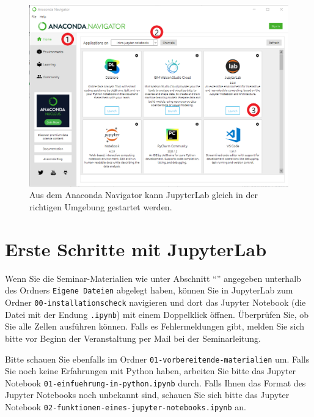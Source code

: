 \documentclass{tufte-handout}
\begin{document}
\begin{figure}[h]
  \includegraphics{anaconda-navigator-jupyterlab--mit-reihenfolge}
  \caption{Aus dem Anaconda Navigator kann JupyterLab gleich in der richtigen Umgebung gestartet werden.}%
\label{fig:start-jupyterlab}
\end{figure}

\section{Erste Schritte mit JupyterLab}

Wenn Sie die Seminar-Materialien wie unter Abschnitt \enquote{} angegeben unterhalb des Ordners \texttt{Eigene Dateien} abgelegt haben, 
können Sie in JupyterLab zum Ordner 
\texttt{00-installationscheck}
navigieren und dort das Jupyter Notebook (die Datei mit der Endung \texttt{.ipynb}) mit einem Doppelklick öffnen.
Überprüfen Sie, ob Sie alle Zellen ausführen können.
Falls es Fehlermeldungen gibt, melden Sie sich bitte vor Beginn der Veranstaltung per Mail bei der Seminarleitung.

Bitte schauen Sie ebenfalls im Ordner
\texttt{01-vorbereitende-materialien}
um.
Falls Sie noch keine Erfahrungen mit Python haben, arbeiten Sie bitte das Jupyter Notebook
\texttt{01-einfuehrung-in-python.ipynb}
durch.
Falls Ihnen das Format des Jupyter Notebooks noch unbekannt sind, schauen Sie sich bitte das Jupyter Notebook
\texttt{02-funktionen-eines-jupyter-notebooks.ipynb}
an.
\end{document}
